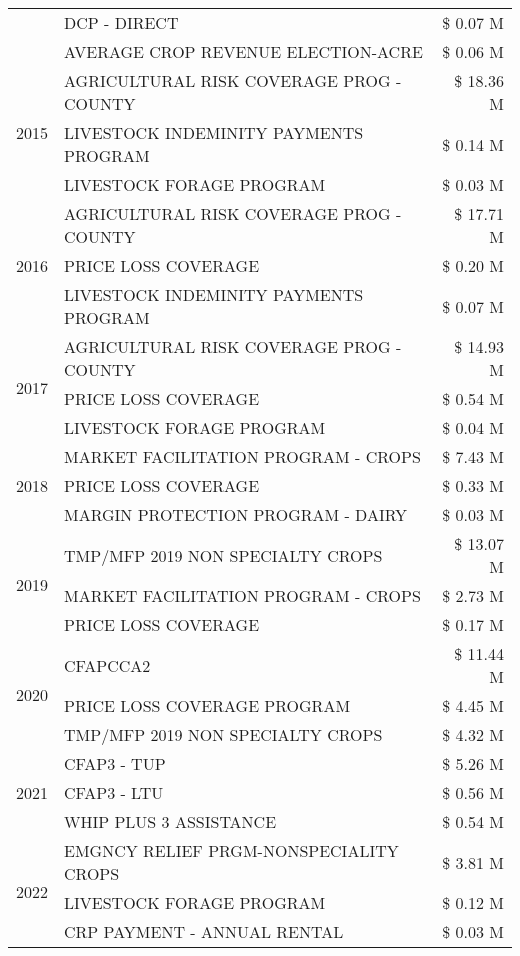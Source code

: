 \begin{tabular}{llr}
 & DCP - DIRECT & \$ 0.07 M \\
 & AVERAGE CROP REVENUE ELECTION-ACRE & \$ 0.06 M \\
\cline{1-3}
\multirow[t]{3}{*}{2015} & AGRICULTURAL RISK COVERAGE PROG - COUNTY & \$ 18.36 M \\
 & LIVESTOCK INDEMINITY PAYMENTS PROGRAM & \$ 0.14 M \\
 & LIVESTOCK FORAGE PROGRAM & \$ 0.03 M \\
\cline{1-3}
\multirow[t]{3}{*}{2016} & AGRICULTURAL RISK COVERAGE PROG - COUNTY & \$ 17.71 M \\
 & PRICE LOSS COVERAGE & \$ 0.20 M \\
 & LIVESTOCK INDEMINITY PAYMENTS PROGRAM & \$ 0.07 M \\
\cline{1-3}
\multirow[t]{3}{*}{2017} & AGRICULTURAL RISK COVERAGE PROG - COUNTY & \$ 14.93 M \\
 & PRICE LOSS COVERAGE & \$ 0.54 M \\
 & LIVESTOCK FORAGE PROGRAM & \$ 0.04 M \\
\cline{1-3}
\multirow[t]{3}{*}{2018} & MARKET FACILITATION PROGRAM - CROPS & \$ 7.43 M \\
 & PRICE LOSS COVERAGE & \$ 0.33 M \\
 & MARGIN PROTECTION PROGRAM - DAIRY & \$ 0.03 M \\
\cline{1-3}
\multirow[t]{3}{*}{2019} & TMP/MFP 2019 NON SPECIALTY CROPS & \$ 13.07 M \\
 & MARKET FACILITATION PROGRAM - CROPS & \$ 2.73 M \\
 & PRICE LOSS COVERAGE & \$ 0.17 M \\
\cline{1-3}
\multirow[t]{3}{*}{2020} & CFAPCCA2 & \$ 11.44 M \\
 & PRICE LOSS COVERAGE PROGRAM & \$ 4.45 M \\
 & TMP/MFP 2019 NON SPECIALTY CROPS & \$ 4.32 M \\
\cline{1-3}
\multirow[t]{3}{*}{2021} & CFAP3 - TUP & \$ 5.26 M \\
 & CFAP3 - LTU & \$ 0.56 M \\
 & WHIP PLUS 3 ASSISTANCE & \$ 0.54 M \\
\cline{1-3}
\multirow[t]{3}{*}{2022} & EMGNCY RELIEF PRGM-NONSPECIALITY CROPS & \$ 3.81 M \\
 & LIVESTOCK FORAGE PROGRAM & \$ 0.12 M \\
 & CRP PAYMENT - ANNUAL RENTAL & \$ 0.03 M \\
\cline{1-3}
\bottomrule
\end{tabular}
